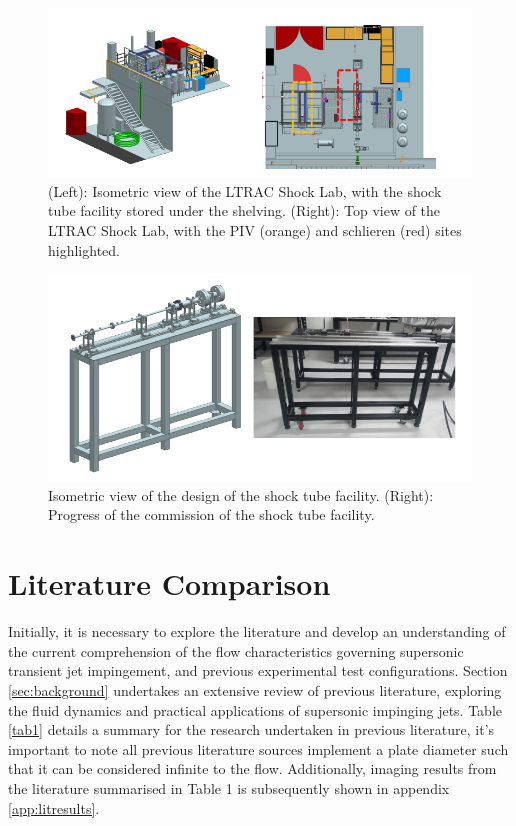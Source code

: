 \begin{figure}[H] 
	\centering
	\includegraphics[width=1\textwidth]{fig10.PNG} 
	\caption{(Left): Isometric view of the LTRAC Shock Lab, with the shock tube facility stored under the
		shelving. (Right): Top view of the LTRAC Shock Lab, with the PIV (orange) and schlieren (red) sites
		highlighted.}
	\label{fig:10}
\end{figure}

\begin{figure}[H] 
	\centering
	\includegraphics[width=1\textwidth]{fig8.PNG} 
	\caption{Isometric view of the design of the shock tube facility. (Right): Progress of the commission
		of the shock tube facility.}
	\label{fig:8}
\end{figure}

\section{Literature Comparison}
Initially, it is necessary to explore the literature and develop an understanding of the current comprehension of the flow characteristics governing supersonic transient jet impingement, and previous experimental test configurations. Section \ref{sec:background} undertakes an extensive review of previous literature, exploring the fluid dynamics and practical applications of supersonic impinging jets. Table \ref{tab1} details a summary for the research undertaken in previous literature, it's important to note all previous literature sources implement a plate diameter such that it can be considered infinite to the flow. Additionally, imaging results from the literature summarised in Table 1 is subsequently shown in appendix \ref{app:litresults}.

